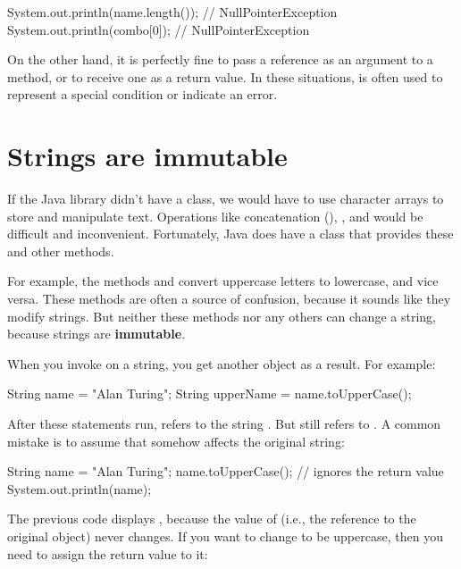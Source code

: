 \begin{code}
System.out.println(name.length());  // NullPointerException
System.out.println(combo[0]);       // NullPointerException
\end{code}

On the other hand, it is perfectly fine to pass a  reference as an argument to a method, or to receive one as a return value.
In these situations,  is often used to represent a special condition or indicate an error.


\section{Strings are immutable}

If the Java library didn't have a  class, we would have to use character arrays to store and manipulate text.
Operations like concatenation (\java{+}), , and  would be difficult and inconvenient.
Fortunately, Java does have a  class that provides these and other methods.


For example, the methods  and  convert uppercase letters to lowercase, and vice versa.
These methods are often a source of confusion, because it sounds like they modify strings.
But neither these methods nor any others can change a string, because strings are {\bf immutable}.

When you invoke  on a string, you get another  object as a result.
For example:

\begin{code}
String name = "Alan Turing";
String upperName = name.toUpperCase();
\end{code}


After these statements run,  refers to the string .
But  still refers to .
A common mistake is to assume that  somehow affects the original string:

\begin{code}
String name = "Alan Turing";
name.toUpperCase();           // ignores the return value
System.out.println(name);
\end{code}

The previous code displays , because the value of  (i.e., the reference to the original  object) never changes.
If you want to change  to be uppercase, then you need to assign the return value to it:

